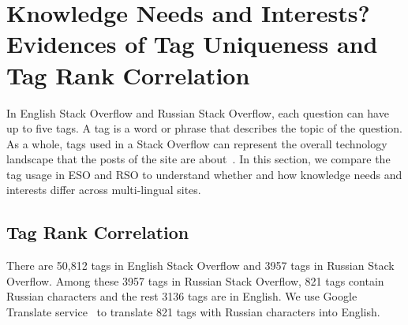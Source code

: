 \section{Knowledge Needs and Interests? Evidences of Tag Uniqueness and Tag Rank Correlation}
In English Stack Overflow and Russian Stack Overflow, each question can have up to five tags. 
A tag is a word or phrase that describes the topic of the question. 
As a whole, tags used in a Stack Overflow can represent the overall technology landscape that the posts of the site are about~\cite{chen2016techland}.
In this section, we compare the tag usage in ESO and RSO to understand whether and how knowledge needs and interests differ across multi-lingual sites.

\subsection{Tag Rank Correlation}
There are 50,812 tags in English Stack Overflow and 3957 tags in Russian Stack Overflow. 
Among these 3957 tags in Russian Stack Overflow, 821 tags contain Russian characters and the rest 3136 tags are in English. 
We use Google Translate service~\cite{web:googleTranslate} to translate 821 tags with Russian characters into English.

